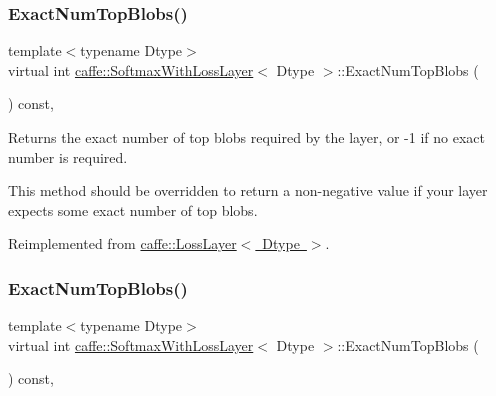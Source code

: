 \subsubsection{\texorpdfstring{Exact\+Num\+Top\+Blobs()}{ExactNumTopBlobs()}\hspace{0.1cm}{\footnotesize\ttfamily [1/2]}}
{\footnotesize\ttfamily template$<$typename Dtype$>$ \\
virtual int \mbox{\hyperlink{classcaffe_1_1_softmax_with_loss_layer}{caffe\+::\+Softmax\+With\+Loss\+Layer}}$<$ Dtype $>$\+::Exact\+Num\+Top\+Blobs (\begin{DoxyParamCaption}{ }\end{DoxyParamCaption}) const\hspace{0.3cm}{\ttfamily [inline]}, {\ttfamily [virtual]}}



Returns the exact number of top blobs required by the layer, or -\/1 if no exact number is required. 

This method should be overridden to return a non-\/negative value if your layer expects some exact number of top blobs. 

Reimplemented from \mbox{\hyperlink{classcaffe_1_1_loss_layer_aa5d5ab714a14082f5343dc9c49025b23}{caffe\+::\+Loss\+Layer$<$ Dtype $>$}}.

\mbox{\label{classcaffe_1_1_softmax_with_loss_layer_a9035d000b2ce51a973f255a5eb2df8e3}} 
\subsubsection{\texorpdfstring{Exact\+Num\+Top\+Blobs()}{ExactNumTopBlobs()}\hspace{0.1cm}{\footnotesize\ttfamily [2/2]}}
{\footnotesize\ttfamily template$<$typename Dtype$>$ \\
virtual int \mbox{\hyperlink{classcaffe_1_1_softmax_with_loss_layer}{caffe\+::\+Softmax\+With\+Loss\+Layer}}$<$ Dtype $>$\+::Exact\+Num\+Top\+Blobs (\begin{DoxyParamCaption}{ }\end{DoxyParamCaption}) const\hspace{0.3cm}{\ttfamily [inline]}, {\ttfamily [virtual]}}



